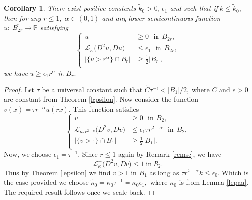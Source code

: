 \documentclass{amsart}
\theoremstyle{plain}
\newtheorem{corollary}[theorem]{Corollary}
\numberwithin{equation}{section}
\begin{document}
\begin{corollary}\label{slepsilon}
There exist positive constants $\tilde{k}_{0}>0,~\epsilon_{1}$ and such that if $k\leq \tilde{k}_{0},$ then for any $r\leq 1,$ $\alpha\in(0,1)$ and any lower semicontinuous function $u:~\overline{B_{2r}}\longrightarrow\mathbb{R}$ satisfying 
\begin{equation*}
\left\{
\begin{aligned}
u&\geq0~~~\text{in}~~B_{2r},\\
\mathcal{L}_{\kappa}^{-}\big(D^{2}u,Du\big)&\leq \epsilon_{1}~~~\text{in}~~B_{2r},\\ 
|\{u>r^{\alpha}\}\cap B_{r}|&\geq \frac{1}{2}|B_{r}|,\\
\end{aligned}
\right.
\end{equation*}
we have $u\geq \epsilon_{1}r^{\alpha}$ in $B_{r}.$
\end{corollary}
\begin{proof}
Let $\tau$ be a universal constant such that $\tilde{C}\tau^{-\epsilon}<|B_{1}|/2,$ where $\tilde{C}$ and $\epsilon>0$ are constant from Theorem \ref{lepsilon}. Now consider the function $v(x)=\tau r^{-\alpha}u(rx).$ This function satisfies
\begin{equation*}
\left\{
\begin{aligned}
v&\geq0~~~\text{in}~~B_{2},\\
\mathcal{L}_{\kappa\tau r^{2-\alpha}}^{-}\big(D^{2}v,Dv\big)&\leq\epsilon_{1}\tau r^{2-\alpha}~~~\text{in}~~B_{2},\\ 
|\{v>\tau\}\cap B_{1}|&\geq \frac{1}{2}|B_{1}|.\\
\end{aligned}
\right.
\end{equation*}
Now, we choose $\epsilon_{1}=\tau^{-1}.$ Since $r\leq 1$ again by Remark \ref{remsc}, we have 
\[\mathcal{L}_{\kappa}^{-}\big(D^{2}v,Dv\big)\leq 1~\text{in}~B_{2}.\]
Thus by Theorem \ref{lepsilon} we find  $v>1$ in $B_{1}$ as long as $\tau r^{2-\alpha}k\leq \epsilon_{0}.$ Which is the case provided we choose $\tilde{\kappa}_{0}=\kappa_{0}\tau^{-1}=\kappa_{0}\epsilon_{1},$ where $\kappa_{0}$ is from Lemma \ref{lepaa}. The required result follows once we scale back.
\end{proof}
\end{document}

